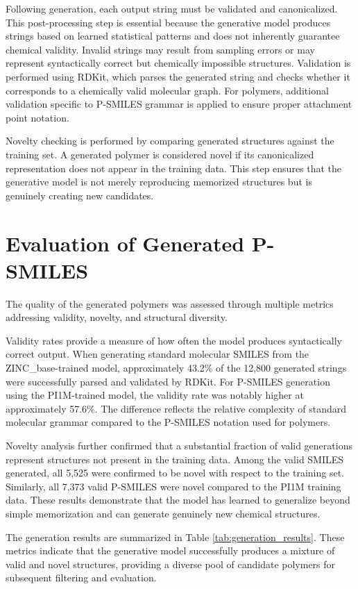 Following generation, each output string must be validated and canonicalized. This post-processing step is essential because the generative model produces strings based on learned statistical patterns and does not inherently guarantee chemical validity. Invalid strings may result from sampling errors or may represent syntactically correct but chemically impossible structures. Validation is performed using RDKit, which parses the generated string and checks whether it corresponds to a chemically valid molecular graph. For polymers, additional validation specific to P-SMILES grammar is applied to ensure proper attachment point notation.

Novelty checking is performed by comparing generated structures against the training set. A generated polymer is considered novel if its canonicalized representation does not appear in the training data. This step ensures that the generative model is not merely reproducing memorized structures but is genuinely creating new candidates.

\section{Evaluation of Generated P-SMILES}
\label{sec:evaluation_generation}

The quality of the generated polymers was assessed through multiple metrics addressing validity, novelty, and structural diversity.

Validity rates provide a measure of how often the model produces syntactically correct output. When generating standard molecular SMILES from the ZINC\_base-trained model, approximately 43.2\% of the 12,800 generated strings were successfully parsed and validated by RDKit. For P-SMILES generation using the PI1M-trained model, the validity rate was notably higher at approximately 57.6\%. The difference reflects the relative complexity of standard molecular grammar compared to the P-SMILES notation used for polymers.

Novelty analysis further confirmed that a substantial fraction of valid generations represent structures not present in the training data. Among the valid SMILES generated, all 5,525 were confirmed to be novel with respect to the training set. Similarly, all 7,373 valid P-SMILES were novel compared to the PI1M training data. These results demonstrate that the model has learned to generalize beyond simple memorization and can generate genuinely new chemical structures.

The generation results are summarized in Table \ref{tab:generation_results}. These metrics indicate that the generative model successfully produces a mixture of valid and novel structures, providing a diverse pool of candidate polymers for subsequent filtering and evaluation.

